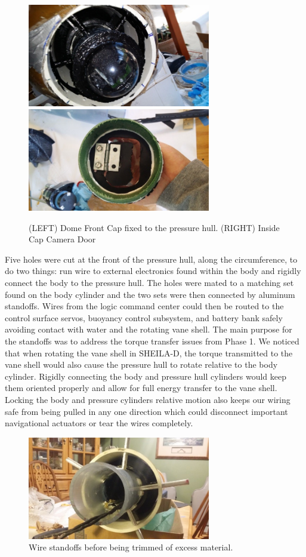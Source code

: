 \documentclass{report}
\begin{document}
\begin{figure}[h]
\centering
\includegraphics[width=8cm]{"PHFront"}
\includegraphics[width=8cm]{"CameraDome"}
\caption{(LEFT) Dome Front Cap fixed to the pressure hull. (RIGHT) Inside Cap Camera Door}
\end{figure}
Five holes were cut at the front of the pressure hull, along the circumference, to do two things: run wire to external electronics found within the body and rigidly connect the body to the pressure hull.  The holes were mated to a matching set found on the body cylinder and the two sets were then connected by aluminum standoffs.  Wires from the logic command center could then be routed to the control surface servos, buoyancy control subsystem, and battery bank safely avoiding contact with water and the rotating vane shell.  The main purpose for the standoffs was to address the torque transfer issues from Phase 1.  We noticed that when rotating the vane shell in SHEILA-D, the torque transmitted to the vane shell would also cause the pressure hull to rotate relative to the body cylinder.  Rigidly connecting the body and pressure hull cylinders would keep them oriented properly and allow for full energy transfer to the vane shell.  Locking the body and pressure cylinders relative motion also keeps our wiring safe from being pulled in any one direction which could disconnect important navigational actuators or tear the wires completely.
\begin{figure}[h]
\centering
\includegraphics[width=8cm]{"standoffs"}
\caption{Wire standoffs before being trimmed of excess material.}
\end{figure}
\end{document}
